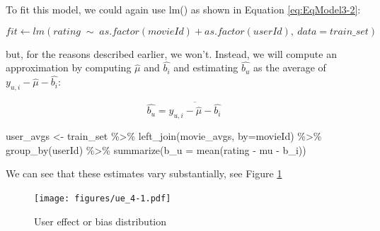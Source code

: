 \documentclass[
]{article}
\newenvironment{Shaded}{}{}
\newcommand{\AttributeTok}[1]{\textcolor[rgb]{0.49,0.56,0.16}{#1}}
\newcommand{\FunctionTok}[1]{\textcolor[rgb]{0.02,0.16,0.49}{#1}}
\newcommand{\NormalTok}[1]{#1}
\newcommand{\OtherTok}[1]{\textcolor[rgb]{0.00,0.44,0.13}{#1}}
\newcommand{\SpecialCharTok}[1]{\textcolor[rgb]{0.25,0.44,0.63}{#1}}
\newcommand{\StringTok}[1]{\textcolor[rgb]{0.25,0.44,0.63}{#1}}
\begin{document}
To fit this model, we could again use lm() as shown in Equation
\ref{eq:EqModel3-2}:

%
\par

\label{eq:EqModel3-2} \begin{equation}
  fit \leftarrow lm(rating \; \sim \; as.factor(movieId) + as.factor(userId), \: data = train\_{}set)
\end{equation}

but, for the reasons described earlier, we won't. Instead, we will
compute an approximation by computing \(\hat{\mu}\) and \(\hat{b_{i}}\)
and estimating \(\hat{b_{u}}\) as the average of
\(y_{u,i}-\hat{\mu}-\hat{b_{i}}\):

%
\par

\label{eq:EqModel3-3} \begin{equation}
  \hat{b_{u}} = \overline{y_{u,i} - \hat{\mu} - \hat{b_{i}}}
\end{equation}

\newpage

\begin{Shaded}
\begin{Highlighting}[]
\NormalTok{user\_avgs }\OtherTok{\textless{}{-}}\NormalTok{ train\_set }\SpecialCharTok{\%\textgreater{}\%} 
  \FunctionTok{left\_join}\NormalTok{(movie\_avgs, }\AttributeTok{by=}\StringTok{\textquotesingle{}movieId\textquotesingle{}}\NormalTok{) }\SpecialCharTok{\%\textgreater{}\%}
  \FunctionTok{group\_by}\NormalTok{(userId) }\SpecialCharTok{\%\textgreater{}\%}
  \FunctionTok{summarize}\NormalTok{(}\AttributeTok{b\_u =} \FunctionTok{mean}\NormalTok{(rating }\SpecialCharTok{{-}}\NormalTok{ mu }\SpecialCharTok{{-}}\NormalTok{ b\_i))}
\end{Highlighting}
\end{Shaded}

We can see that these estimates vary substantially, see Figure
\ref{fig:model_3}

\begin{figure}
\centering
\texttt{[image: figures/ue\_4-1.pdf]}
\caption{User effect or bias distribution\label{fig:model_3}}
\end{figure}
\end{document}
